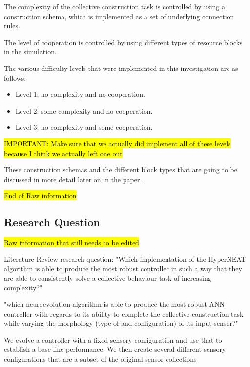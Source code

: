 \documentclass[conference]{IEEEtran}
\begin{document}
The complexity of the collective construction task is controlled by using a construction schema, which is implemented as a set of underlying connection rules.

The level of cooperation is controlled by using different types of resource blocks in the simulation.

The various difficulty levels that were implemented in this investigation are as follows:
\begin{itemize}
	\item Level 1: no complexity and no cooperation.
	\item Level 2: some complexity and no cooperation.
	\item Level 3: no complexity and some cooperation.
\end{itemize}

\hl{IMPORTANT: Make sure that we actually did implement all of these levels because I think we actually left one out}

These construction schemas and the different block types that are going to be discussed in more detail later on in the paper.


\hl{End of Raw information}

\subsection{Research Question}

\hl{Raw information that still needs to be edited}


Literature Review research question:
"Which implementation of the HyperNEAT algorithm is able to produce the most robust controller in such a way that they are able to consistently solve a collective behaviour task of increasing complexity?"


"which neuroevolution algorithm is able to produce the most robust ANN controller with regards to its ability to complete the collective construction task while varying the morphology (type of and configuration) of its input sensor?"

We evolve a controller with a fixed sensory configuration and use that to establish a base line performance. We then create several different sensory configurations that are a subset of the original sensor collections
\end{document}
